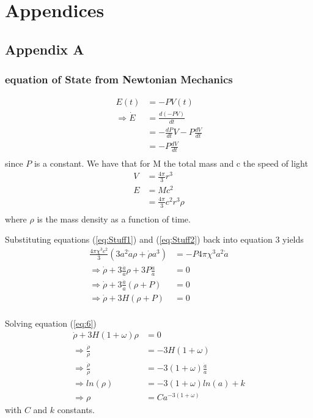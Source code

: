 \documentclass[a4paper, 11pt]{FSKH_623_Report}
\numberwithin{equation}{section}
\newcommand{\driv}[2]{\frac{d #1}{d #2}}
\begin{document}
\newpage
\chapter{Appendices}
\section*{Appendix A}
\subsection*{equation of State from Newtonian Mechanics}

\begin{equation}
\begin{split}
E(t) &= -PV(t)\\
\Rightarrow \dot{E} &= \frac{d\left(-PV\right)}{dt}\\
&= -\driv{P}{t}V-P\driv{V}{t}\\
&= -P\driv{V}{t}             \\
\end{split}
\end{equation}
since $P$ is a constant.
We have that for M the total mass and c the speed of light 
\begin{equation}
\begin{split}
V &= \frac{4\pi}{3}r^{3}\\
E &= Mc^{2}\\
&=\frac{4\pi}{3}c^{2}r^{3}\rho\\
\end{split}
\end{equation}
where $\rho$ is the mass density as a function of time.

Substituting equations (\ref{eq:Stuff1}) and (\ref{eq:Stuff2}) back into equation 3 yields
\begin{equation}
\begin{split}
\frac{4\pi\chi^{3} c^{2}}{3}\left(3a^{2}\dot{a}\rho+\dot{\rho}a^{3}\right) &= -P4\pi\chi^{3}a^{2}\dot{a}\\
\Rightarrow \dot{\rho}+3\frac{\dot{a}}{a}\rho+3P\frac{\dot{a}}{a} &= 0\\
\Rightarrow \dot{\rho}+3\frac{\dot{a}}{a}\left(\rho+P\right) &= 0\\
\Rightarrow \dot{\rho}+3H\left(\rho+P\right) &= 0\\
\end{split}
\end{equation}


Solving equation (\ref{eq:6}) 
\begin{equation}
\begin{split}
\dot{\rho}+3H\left(1+\omega\right)\rho &= 0\\
\Rightarrow \frac{\dot{\rho}}{\rho} &= -3H\left(1+\omega\right)\\
\Rightarrow \frac{\dot{\rho}}{\rho} &= -3\left(1+\omega\right)\frac{\dot{a}}{a}\\
\Rightarrow ln(\rho) &= -3\left(1+\omega\right)ln(a) + k\\
\Rightarrow \rho &= Ca^{-3\left(1+\omega\right)}
\end{split}
\end{equation}
with $C$ and $k$ constants.
\end{document}
